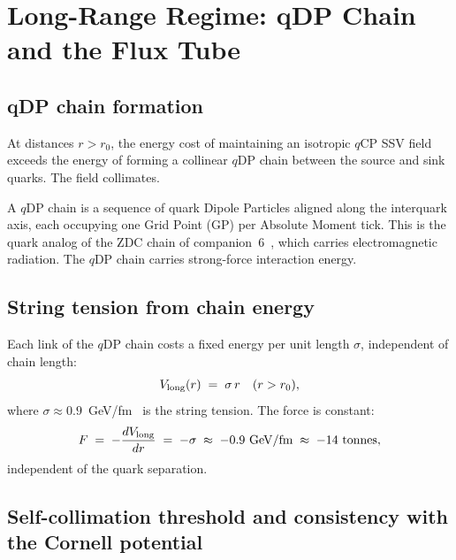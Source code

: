 \documentclass[12pt]{article}
\newcommand{\qCP}{q\mathrm{CP}}
\newcommand{\qDP}{q\mathrm{DP}}
\begin{document}
\section{Long-Range Regime: qDP Chain and the Flux Tube}
\label{sec:long}

\subsection{qDP chain formation}

At distances $r > r_0$, the energy cost of maintaining an isotropic
$\qCP$ SSV field exceeds the energy of forming a collinear $\qDP$
chain between the source and sink quarks. The field collimates.

A $\qDP$ chain is a sequence of quark Dipole Particles aligned along
the interquark axis, each occupying one Grid Point (GP) per Absolute
Moment tick. This is the quark analog of the ZDC chain of
companion~6~\cite{c6}, which carries electromagnetic radiation.
The $\qDP$ chain carries strong-force interaction energy.

\subsection{String tension from chain energy}

Each link of the $\qDP$ chain costs a fixed energy per unit length
$\sigma$, independent of chain length:
\begin{equation}
V_{\rm long}(r) \;=\; \sigma\,r
\quad (r > r_0),
\label{eq:V_long}
\end{equation}
where $\sigma \approx 0.9$~GeV/fm~\cite{bali2001} is the string tension.
The force is constant:
\begin{equation}
F \;=\; -\frac{dV_{\rm long}}{dr} \;=\; -\sigma
\;\approx\; -0.9\ \mathrm{GeV/fm}
\;\approx\; -14\ \mathrm{tonnes},
\label{eq:string_force}
\end{equation}
independent of the quark separation.

\subsection{Self-collimation threshold and consistency with the Cornell potential}
\label{subsec:energy_match}
\end{document}
